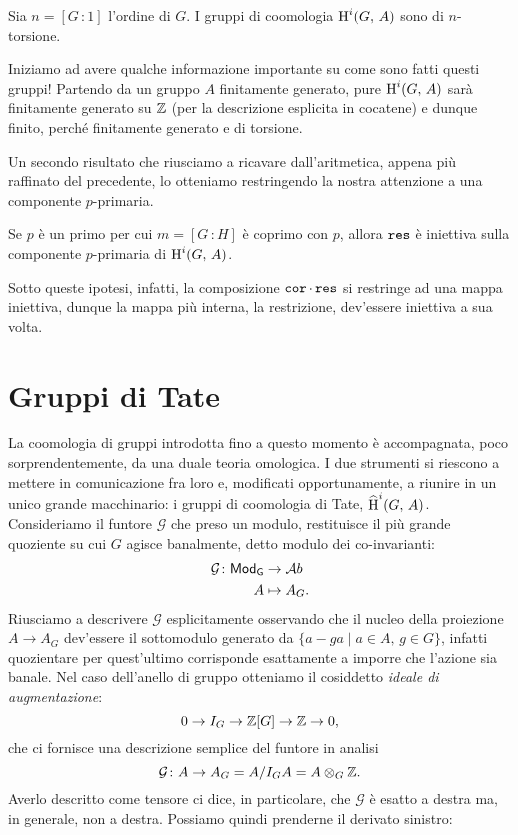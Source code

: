 \begin{corollary}
	Sia $ n = [G 	\,\colon 1] $ l'ordine di $ G $. I gruppi di coomologia $ \operatorname{H}^i(G, \, A) $ sono di $ n $-torsione.
\end{corollary}

Iniziamo ad avere qualche informazione importante su come sono fatti questi gruppi! Partendo da un gruppo $ A $ finitamente generato, pure $ \operatorname{H}^i(G, \, A) $ sarà finitamente generato su $ \mathbb{Z} $ (per la descrizione esplicita in cocatene) e dunque finito, perché finitamente generato e di torsione.

Un secondo risultato che riusciamo a ricavare dall'aritmetica, appena più raffinato del precedente, lo otteniamo restringendo la nostra attenzione a una componente $ p $-primaria.

\begin{lemma}
	Se $ p $ è un primo per cui $ m = [G \, \colon H] $ è coprimo con $ p $, allora $ \operatorname{\mathtt{res}} $ è iniettiva sulla componente $ p $-primaria di $ \operatorname{H}^i(G, \, A) $.
\end{lemma}

Sotto queste ipotesi, infatti, la composizione $ \operatorname{\mathtt{cor}} \cdot \operatorname{\mathtt{res}} $ si restringe ad una mappa iniettiva, dunque la mappa più interna, la restrizione, dev'essere iniettiva a sua volta.

\section{Gruppi di Tate}
La coomologia di gruppi introdotta fino a questo momento è accompagnata, poco sorprendentemente, da una duale teoria omologica. I due strumenti si riescono a mettere in comunicazione fra loro e, modificati opportunamente, a riunire in un unico grande macchinario: i gruppi di coomologia di Tate, $ \operatorname{\widehat{H}}^i(G, \, A) $. \\

Consideriamo il funtore $ \mathcal{G} $ che preso un modulo, restituisce il più grande quoziente su cui $ G $ agisce banalmente, detto modulo dei co-invarianti:
\begin{align*} 
\mathcal{G} \colon \mathsf{Mod}_\mathsf{G} &\to \mathcal{A}b \\
A &\mapsto A_G.
\end{align*}
Riusciamo a descrivere $ \mathcal{G} $ esplicitamente osservando che il nucleo della proiezione $ A \to A_G $ dev'essere il sottomodulo generato da $ \{ a - ga \mid a \in A, \, g \in G \} $, infatti quozientare per quest'ultimo corrisponde esattamente a imporre che l'azione sia banale. Nel caso dell'anello di gruppo otteniamo il cosiddetto \emph{ideale di augmentazione}:
\[ 0 \to I_G \to \mathbb{Z}[G] \to \mathbb{Z} \to 0, \]
che ci fornisce una descrizione semplice del funtore in analisi
\[ \mathcal{G} \colon A \to A_G = A/I_GA = A \otimes_G \mathbb{Z}. \]
Averlo descritto come tensore ci dice, in particolare, che $ \mathcal{G} $ è esatto a destra ma, in generale, non a destra. Possiamo quindi prenderne il derivato sinistro:

